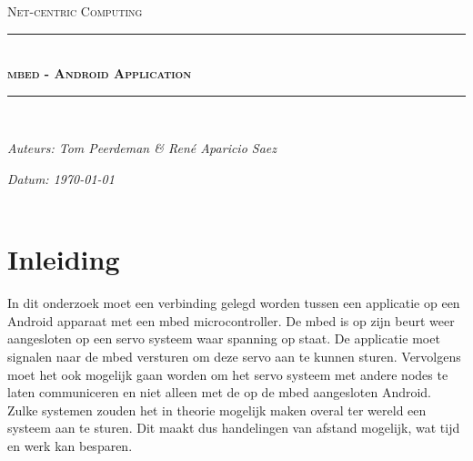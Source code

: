 \documentclass[a4paper]{article}
\newcommand{\HRule}{\rule{\linewidth}{0.5mm}}
\begin{document}
	\begin{titlepage}
	\begin{center}
		\textsc{\Large Net-centric Computing}\\[0.5cm]
		\HRule \\[0,4cm]
		\textsc{\huge \bfseries mbed - Android Application}
		\HRule \\[8cm]
		\begin{minipage}{0.4\textwidth}
			\begin{flushleft}\large
				\emph{Auteurs: Tom Peerdeman \& Ren\'e Aparicio Saez}\\
			\end{flushleft}
		\end{minipage}
		\begin{minipage}{0.4\textwidth}
			\begin{flushright}\large
			\emph{Datum: \today\\\hspace{1cm}}\\
			\end{flushright}
		\end{minipage}
	\end{center}
	\end{titlepage}

	\section{Inleiding}
		In dit onderzoek moet een verbinding gelegd worden tussen een applicatie op een Android apparaat met een mbed microcontroller. De mbed is op zijn beurt weer aangesloten op een servo systeem waar spanning op staat. De applicatie moet signalen naar de mbed versturen om deze servo aan te kunnen sturen. Vervolgens moet het ook mogelijk gaan worden om het servo systeem met andere nodes te laten communiceren en niet alleen met de op de mbed aangesloten Android. Zulke systemen zouden het in theorie mogelijk maken overal ter wereld een systeem aan te sturen. Dit maakt dus handelingen van afstand mogelijk, wat tijd en werk kan besparen.
\end{document}
